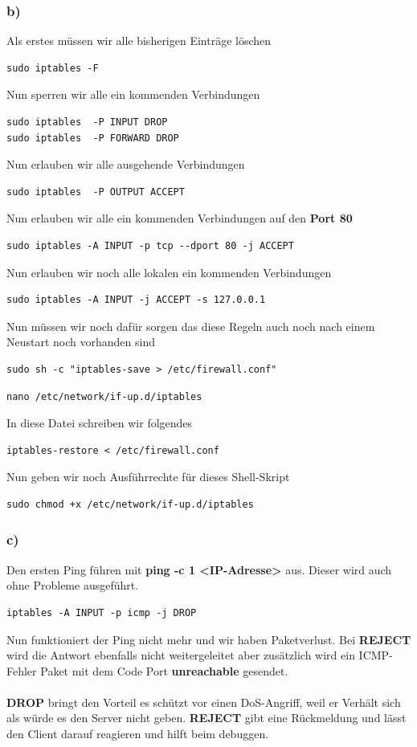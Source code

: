 \subsubsection{b)}
Als erstes müssen wir alle bisherigen Einträge löschen
\begin{lstlisting}
sudo iptables -F
\end{lstlisting}
Nun sperren wir alle ein kommenden Verbindungen
\begin{lstlisting}
sudo iptables  -P INPUT DROP
sudo iptables  -P FORWARD DROP
\end{lstlisting}
Nun erlauben wir alle ausgehende Verbindungen 
\begin{lstlisting}
sudo iptables  -P OUTPUT ACCEPT 
\end{lstlisting}
Nun erlauben wir alle ein kommenden Verbindungen auf den \textbf{Port 80}
\begin{lstlisting}
sudo iptables -A INPUT -p tcp --dport 80 -j ACCEPT
\end{lstlisting}
Nun erlauben wir noch alle lokalen ein kommenden Verbindungen
\begin{lstlisting}
sudo iptables -A INPUT -j ACCEPT -s 127.0.0.1 
\end{lstlisting}
Nun müssen wir noch dafür sorgen das diese Regeln auch noch nach einem Neustart noch vorhanden sind
\begin{lstlisting}
sudo sh -c "iptables-save > /etc/firewall.conf"
\end{lstlisting}
\begin{lstlisting}
nano /etc/network/if-up.d/iptables
\end{lstlisting}
In diese Datei schreiben wir folgendes 
\begin{lstlisting}
iptables-restore < /etc/firewall.conf
\end{lstlisting}
Nun geben wir noch Ausführrechte für dieses Shell-Skript
\begin{lstlisting}
sudo chmod +x /etc/network/if-up.d/iptables
\end{lstlisting}

\subsubsection{c)}
Den ersten Ping führen mit \textbf{ping -c 1 <IP-Adresse>} aus. Dieser wird auch ohne Probleme ausgeführt.
\begin{lstlisting}
iptables -A INPUT -p icmp -j DROP
\end{lstlisting}
Nun funktioniert der Ping nicht mehr und wir haben Paketverlust.
Bei \textbf{REJECT} wird die Antwort ebenfalls nicht weitergeleitet aber zusätzlich
wird ein ICMP-Fehler Paket mit dem Code Port \textbf{unreachable} gesendet.\\\\
\textbf{DROP} bringt den Vorteil es schützt vor einen DoS-Angriff, weil er Verhält sich als würde es den Server nicht geben. \textbf{REJECT} gibt eine Rückmeldung und lässt den Client darauf reagieren und hilft beim debuggen.

